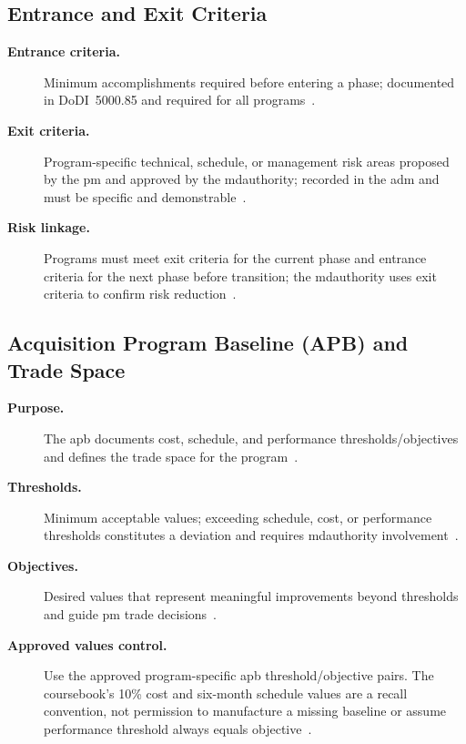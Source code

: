 \documentclass[../main.tex]{subfiles}
\begin{document}
\subsection{Entrance and Exit Criteria}
\begin{description}
  \item[\textbf{Entrance criteria.}] Minimum accomplishments required before entering a phase; documented in DoDI~5000.85 and required for all programs~\autocite{DoDI5000-85,edo-3-3-2-acq-milestones-phases-2025}.
  \item[\textbf{Exit criteria.}] Program-specific technical, schedule, or management risk areas proposed by the \ac{pm} and approved by the \ac{mdauthority}; recorded in the \ac{adm} and must be specific and demonstrable~\autocite{DoDI5000-85,edo-3-3-2-acq-milestones-phases-2025}.
  \item[\textbf{Risk linkage.}] Programs must meet exit criteria for the current phase and entrance criteria for the next phase before transition; the \ac{mdauthority} uses exit criteria to confirm risk reduction~\autocite{DoDI5000-85,edo-3-3-2-acq-milestones-phases-2025}.
\end{description}

\subsection{Acquisition Program Baseline (APB) and Trade Space}
\begin{description}
  \item[\textbf{Purpose.}] The \ac{apb} documents cost, schedule, and performance thresholds/objectives and defines the trade space for the program~\autocite{DoDI5000-85,edo-3-3-2-acq-milestones-phases-2025}.
  \item[\textbf{Thresholds.}] Minimum acceptable values; exceeding schedule, cost, or performance thresholds constitutes a deviation and requires \ac{mdauthority} involvement~\autocite{DoDI5000-85,edo-3-3-2-acq-milestones-phases-2025}.
  \item[\textbf{Objectives.}] Desired values that represent meaningful improvements beyond thresholds and guide \ac{pm} trade decisions~\autocite{DoDI5000-85,edo-3-3-2-acq-milestones-phases-2025}.
  \item[\textbf{Approved values control.}] Use the approved program-specific \ac{apb} threshold/objective pairs. The coursebook's 10\% cost and six-month schedule values are a recall convention, not permission to manufacture a missing baseline or assume performance threshold always equals objective~\autocite{edo-3-3-2-acq-milestones-phases-2025,DoDI5000-85}.
\end{description}
\end{document}
